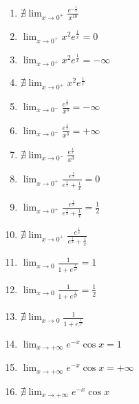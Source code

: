 \documentclass[11pt,a4paper]{article}
\begin{document}
\begin{enumerate}
\item $\displaystyle \nexists \lim_{x \to 0^{+}} \frac{e^{-\frac{1}{x}}}{x^{10}}$
\item $\displaystyle \lim_{x \to 0^{+}} x^{2} e^{\frac{1}{x}} = 0$
\item $\displaystyle \lim_{x \to 0^{+}} x^{2} e^{\frac{1}{x}} = -\infty$
\item $\displaystyle \nexists \lim_{x \to 0^{+}} x^{2} e^{\frac{1}{x}}$
\item $\displaystyle \lim_{x \to 0^{-}} \frac{e^{\frac{1}{x}}}{x^{3}} = -\infty$
\item $\displaystyle \lim_{x \to 0^{-}} \frac{e^{\frac{1}{x}}}{x^{3}} = +\infty$
\item $\displaystyle \nexists \lim_{x \to 0^{-}} \frac{e^{\frac{1}{x}}}{x^{3}}$
\item $\displaystyle \lim_{x \to 0^{+}} \frac{e^{\frac{1}{x}}}{e^{\frac{1}{x}} + \frac{1}{x}} = 0$
\item $\displaystyle \lim_{x \to 0^{+}} \frac{e^{\frac{1}{x}}}{e^{\frac{1}{x}} + \frac{1}{x}} = \frac{1}{2}$
\item $\displaystyle \nexists \lim_{x \to 0^{+}} \frac{e^{\frac{1}{x}}}{e^{\frac{1}{x}} + \frac{1}{x}}$
\item $\displaystyle \lim_{x \to 0} \frac{1}{1 + e^{\frac{1}{x^{2}}}} = 1$
\item $\displaystyle \lim_{x \to 0} \frac{1}{1 + e^{\frac{1}{x^{2}}}} = \frac{1}{2}$
\item $\displaystyle \nexists \lim_{x \to 0} \frac{1}{1 + e^{\frac{1}{x^{2}}}}$
\item $\displaystyle \lim_{x \to +\infty} e^{-x}\cos x = 1$
\item $\displaystyle \lim_{x \to +\infty} e^{-x}\cos x = +\infty$
\item $\displaystyle \nexists \lim_{x \to +\infty} e^{-x}\cos x$
\end{enumerate}
\end{document}
